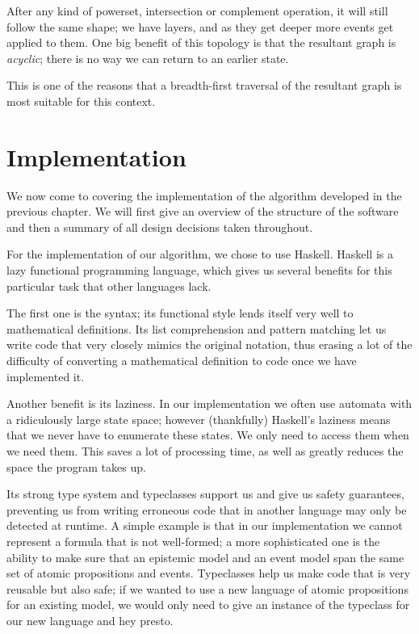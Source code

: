 \documentclass[10pt, a4paper]{report}
\begin{document}
After any kind of powerset, intersection or complement operation, it will still
follow the same shape; we have layers, and as they get deeper more events get
applied to them. One big benefit of this topology is that the resultant graph is
\emph{acyclic}; there is no way we can return to an earlier state.

This is one of the reasons that a breadth-first traversal of the resultant graph
is most suitable for this context. 

\newpage 

\chapter{Implementation}

We now come to covering the implementation of the algorithm developed in the
previous chapter. We will first give an overview of the structure of the
software and then a summary of all design decisions taken throughout. 

\bigskip

For the implementation of our algorithm, we chose to use Haskell. Haskell is a
lazy functional programming language, which gives us several benefits for this
particular task that other languages lack. 

The first one is the syntax; its functional style lends itself very well to
mathematical definitions. Its list comprehension and pattern matching let us
write code that very closely mimics the original notation, thus erasing a lot of
the difficulty of converting a mathematical definition to code once we have
implemented it. 

Another benefit is its laziness. In our implementation we often use automata
with a ridiculously large state space; however (thankfully) Haskell's laziness
means that we never have to enumerate these states. We only need to access them
when we need them. This saves a lot of processing time, as well as greatly
reduces the space the program takes up.

Its strong type system and typeclasses support us and give us safety guarantees,
preventing us from writing erroneous code that in another language may only be
detected at runtime. A simple example is that in our implementation we cannot
represent a formula that is not well-formed; a more sophisticated one is the
ability to make sure that an epistemic model and an event model span the same
set of atomic propositions and events. Typeclasses help us make code that is
very reusable but also safe; if we wanted to use a new language of atomic
propositions for an existing model, we would only need to give an instance of
the  typeclass for our new language and hey presto.
\end{document}
